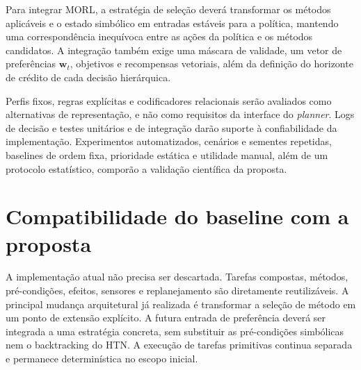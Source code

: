 Para integrar MORL, a estratégia de seleção deverá transformar os métodos
aplicáveis e o estado simbólico em entradas estáveis para a política, mantendo
uma correspondência inequívoca entre as ações da política e os métodos candidatos.
A integração também exige uma máscara de validade, um vetor de preferências
$\mathbf{w}_t$, objetivos e recompensas vetoriais, além da definição do horizonte
de crédito de cada decisão hierárquica.

Perfis fixos, regras explícitas e codificadores relacionais serão avaliados como
alternativas de representação, e não como requisitos da interface do
\textit{planner}. Logs de decisão e testes unitários e de integração darão suporte
à confiabilidade da implementação. Experimentos automatizados, cenários e sementes
repetidas, baselines de ordem fixa, prioridade estática e utilidade manual, além de
um protocolo estatístico, comporão a validação científica da proposta.

\section{Compatibilidade do baseline com a proposta}

A implementação atual não precisa ser descartada.
Tarefas compostas, métodos, pré-condições, efeitos, sensores e replanejamento
são diretamente reutilizáveis.
A principal mudança arquitetural já realizada é transformar a seleção de método
em um ponto de extensão explícito.
A futura entrada de preferência deverá ser integrada a uma estratégia concreta,
sem substituir as pré-condições simbólicas nem o backtracking do HTN.
A execução de tarefas primitivas continua separada e permanece determinística
no escopo inicial.
